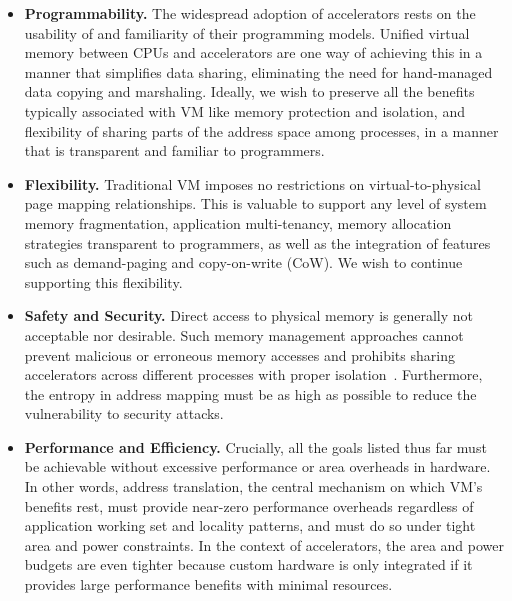 \begin{itemize}
        \item \textbf{Programmability.} The widespread adoption of
          accelerators rests on the usability of and familiarity of
          their programming models. Unified virtual memory between
          CPUs and accelerators are one way of achieving this in a
          manner that simplifies data sharing, eliminating the need
          for hand-managed data copying and marshaling. Ideally, we
          wish to preserve all the benefits typically associated with
          VM like memory protection and isolation, and flexibility of
          sharing parts of the address space among processes, in a
          manner that is transparent and familiar to programmers.

        \item \textbf{Flexibility.} Traditional VM imposes no
          restrictions on virtual-to-physical page mapping
          relationships. This is valuable to support any level of
          system memory fragmentation, application multi-tenancy,
          memory allocation strategies transparent to programmers, as
          well as the integration of features such as demand-paging
          and copy-on-write (CoW). We wish to continue supporting this
          flexibility.

        \item \textbf{Safety and Security.} Direct access to physical
          memory is generally not acceptable nor desirable. Such
          memory management approaches cannot prevent malicious or
          erroneous memory accesses and prohibits sharing accelerators
          across different processes with proper
          isolation~\cite{haria:devirtualizing}. Furthermore, the
          entropy in address mapping must be as high as possible to
          reduce the vulnerability to security attacks.

        \item \textbf{Performance and Efficiency.} Crucially, all the
          goals listed thus far must be achievable without excessive
          performance or area overheads in hardware. In other words,
          address translation, the central mechanism on which VM's
          benefits rest, must provide near-zero performance overheads
          regardless of application working set and locality patterns,
          and must do so under tight area and power constraints. In
          the context of accelerators, the area and power budgets are
          even tighter because custom hardware is only integrated if
          it provides large performance benefits with minimal
          resources.


\end{itemize}


